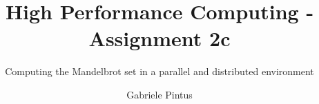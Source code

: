 \title{High Performance Computing - Assignment 2c}
\subtitle{Computing the Mandelbrot set in a parallel and distributed environment}

%
%


%
% 
\author{Gabriele Pintus}


